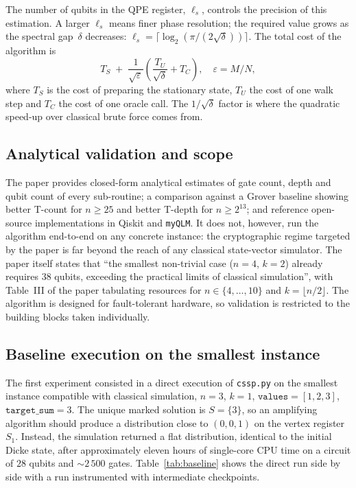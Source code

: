 \documentclass[11pt,a4paper]{article}
\begin{document}
The number of qubits in the QPE register, $\ell_s$, controls the precision of this estimation. A larger $\ell_s$ means finer phase resolution; the required value grows as the spectral gap~$\delta$ decreases: $\ell_s = \lceil \log_2(\pi / (2\sqrt{\delta})) \rceil$. The total cost of the algorithm is
\[
T_S \;+\; \frac{1}{\sqrt{\varepsilon}}\!\left(\frac{T_U}{\sqrt{\delta}} + T_C\right),
\quad \varepsilon = M/N ,
\]
where $T_S$ is the cost of preparing the stationary state, $T_U$ the cost of one walk step and $T_C$ the cost of one oracle call. The $1/\sqrt{\delta}$ factor is where the quadratic speed-up over classical brute force comes from.

\subsection{Analytical validation and scope}

The paper provides closed-form analytical estimates of gate
count, depth and qubit count of every sub-routine; a comparison
against a Grover baseline showing better T-count for $n \ge 25$
and better T-depth for $n \ge 2^{13}$; and reference
open-source implementations in Qiskit and \texttt{myQLM}. It does
not, however, run the algorithm end-to-end on any concrete
instance: the cryptographic regime targeted by the paper is
far beyond the reach of any classical state-vector simulator. The paper itself
states that ``the smallest non-trivial case ($n=4$, $k=2$)
already requires $38$ qubits, exceeding the practical limits of
classical simulation'', with Table~III of the paper tabulating resources for
$n \in \{4,\dots,10\}$ and $k = \lfloor n/2 \rfloor$. The
algorithm is designed for fault-tolerant hardware, so validation
is restricted to the building blocks taken individually.

\subsection{Baseline execution on the smallest instance}

The first experiment consisted in a direct execution of
\texttt{cssp.py} on the smallest instance compatible with
classical simulation,
$n=3$, $k=1$, $\mathtt{values}=[1,2,3]$, $\mathtt{target\_sum}=3$.
The unique marked solution is $S=\{3\}$, so an amplifying
algorithm should produce a distribution close to $(0,0,1)$ on the
vertex register $S_1$. Instead, the simulation returned a flat
distribution, identical to the initial Dicke state, after
approximately eleven hours of single-core CPU time on a circuit
of $28$ qubits and $\sim\!2\,500$ gates. Table~\ref{tab:baseline}
shows the direct run side by side with a run instrumented with
intermediate checkpoints.
\end{document}
